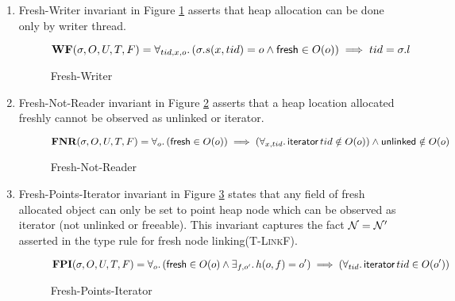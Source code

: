 \begin{enumerate}
\item{Fresh-Writer} invariant in Figure \ref{fig:fmut} asserts that heap allocation can be done only by writer thread.
  \begin{figure}[!htb]
  \[
\textbf{WF}(\sigma,O,U,T,F) =
 \forall_{tid,x,o} \ldotp (\sigma.s(x,tid) = o \land \textsf{fresh} \in O(o) ) \implies  tid = \sigma.l 
\]
\caption{Fresh-Writer}
\label{fig:fmut}
  \end{figure}
\item{Fresh-Not-Reader} invariant in Figure \ref{fig:fnotreader} asserts that a heap location allocated freshly cannot be observed as \textsf{unlinked} or \textsf{iterator}.
  \begin{figure}[!htb]
  \[
\textbf{FNR}(\sigma,O,U,T,F) =
 \forall_{o} \ldotp (\textsf{fresh} \in O(o) ) \implies  (\forall_{x,tid} \ldotp \textsf{iterator}\,tid  \notin O(o)  ) \land \textsf{unlinked} \notin O(o) 
\]
\caption{Fresh-Not-Reader}
\label{fig:fnotreader}
  \end{figure}
\item{Fresh-Points-Iterator} invariant in Figure \ref{fig:fsinglefield} states that any field of fresh allocated object can only be set to point heap node which can be observed as \textsf{iterator} (not \textsf{unlinked or freeable}).  This invariant captures the fact $\mathcal{N} = \mathcal{N}'$ asserted in the type rule for fresh node linking(\textsc{T-LinkF}). 
  \begin{figure}[!htb]
  \[
\textbf{FPI}(\sigma,O,U,T,F) =
 \forall_{o} \ldotp (\textsf{fresh} \in O(o)  \land \exists_{f,o'}\ldotp h(o,f)=o') \implies (\forall_{tid} \ldotp  \textsf{iterator}\,tid \in O(o')) 
\]
\caption{Fresh-Points-Iterator}
\label{fig:fsinglefield}
  \end{figure}
   

\end{enumerate}
